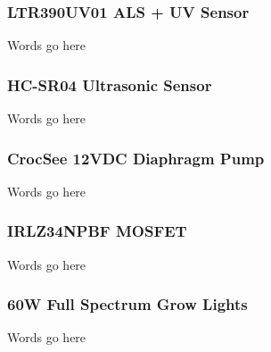 \documentclass[12pt]{article}
\begin{document}
\subsubsection{LTR390UV01 ALS + UV Sensor}
\noindent Words go here
\newline
\newline
\subsubsection{HC-SR04 Ultrasonic Sensor}
\noindent Words go here
\newline
\newline
\subsubsection{CrocSee 12VDC Diaphragm Pump}
\noindent Words go here
\newline
\newline
\subsubsection{IRLZ34NPBF MOSFET}
\noindent Words go here
\newline
\newline
\subsubsection{60W Full Spectrum Grow Lights}
\noindent Words go here
\newline
\newline
\end{document}
